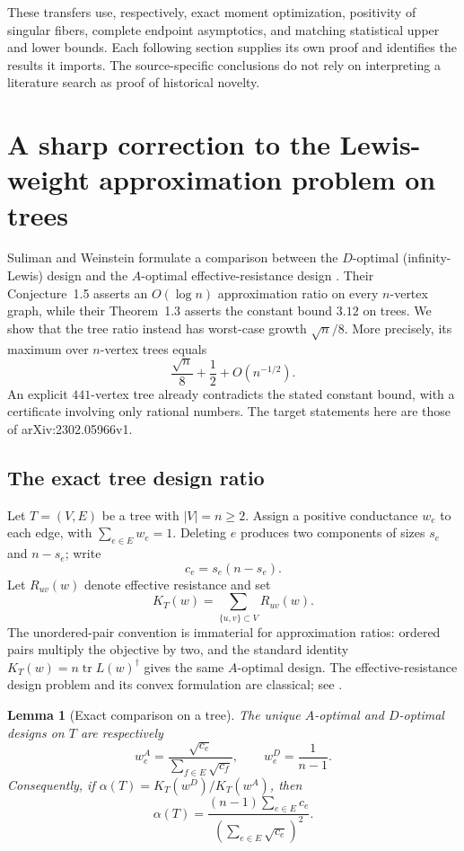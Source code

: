 \documentclass[11pt,a4paper]{article}
\newtheorem{lemma}[theorem]{Lemma}
\theoremstyle{definition}
\theoremstyle{remark}
\numberwithin{equation}{section}
\begin{document}
These transfers use, respectively, exact moment optimization, positivity
of singular fibers, complete endpoint asymptotics, and matching statistical
upper and lower bounds. Each following section supplies its own proof and
identifies the results it imports. The source-specific conclusions do not
rely on interpreting a literature search as proof of historical novelty.



\section{A sharp correction to the Lewis-weight approximation problem on trees}
\label{p2:sec:lewis-trees}

Suliman and Weinstein formulate a comparison between the $D$-optimal
(infinity-Lewis) design and the $A$-optimal effective-resistance design
\cite{p2:SulimanWeinstein2023}.
Their Conjecture~1.5 asserts an $O(\log n)$ approximation ratio on every
$n$-vertex graph, while their Theorem~1.3 asserts the constant bound $3.12$
on trees.  We show that the tree ratio instead has worst-case growth
$\sqrt n/8$.  More precisely, its maximum over $n$-vertex trees equals
\[
 \frac{\sqrt n}{8}+\frac12+O(n^{-1/2}).
\]
An explicit $441$-vertex tree already contradicts the stated constant
bound, with a certificate involving only rational numbers.
The target statements here are those of arXiv:2302.05966v1.

\subsection{The exact tree design ratio}

Let $T=(V,E)$ be a tree with $|V|=n\geq2$.
Assign a positive conductance $w_e$ to each edge, with
$\sum_{e\in E}w_e=1$.
Deleting $e$ produces two components of sizes $s_e$ and $n-s_e$; write
\[
 c_e=s_e(n-s_e).
\]
Let $R_{uv}(w)$ denote effective resistance and set
\[
 K_T(w)=\sum_{\{u,v\}\subset V} R_{uv}(w).
\]
The unordered-pair convention is immaterial for approximation ratios:
ordered pairs multiply the objective by two, and the standard identity
$K_T(w)=n\operatorname{tr}L(w)^\dagger$ gives the same $A$-optimal design.
The effective-resistance design problem and its convex formulation are
classical; see \cite{p5:GBS2008}.

\begin{lemma}[Exact comparison on a tree]\label{p2:lem:tree-design-ratio}
The unique $A$-optimal and $D$-optimal designs on $T$ are respectively
\[
 w_e^A=\frac{\sqrt{c_e}}{\sum_{f\in E}\sqrt{c_f}},
 \qquad
 w_e^D=\frac1{n-1}.
\]
Consequently, if $\alpha(T)=K_T(w^D)/K_T(w^A)$, then
\begin{equation}\label{p2:eq:lewis-tree-ratio}
 \alpha(T)=\frac{(n-1)\sum_{e\in E}c_e}
                  {\left(\sum_{e\in E}\sqrt{c_e}\right)^2}.
\end{equation}
\end{lemma}
\end{document}
